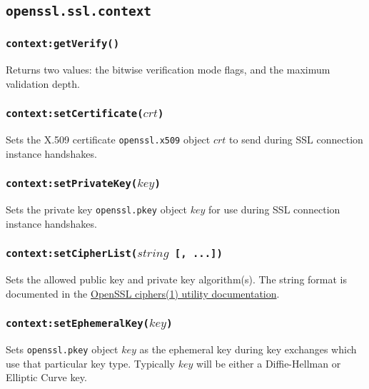 \documentclass[11pt, oneside]{memoir}
\newcommand*{\fn}[1]{\texttt{#1}\xspace}
\newcommand*{\module}[1]{\texttt{#1}\xspace}
\newcounter{toccols}
\newenvironment{Module}[1]{
	\subsection{\texttt{#1}}
	\addtocontents{toc}{
		\protect\begin{multicols}{\value{toccols}}
	}
}{
	\addtocontents{toc}{\protect\end{multicols}}
}
\begin{document}
\begin{Module}{openssl.ssl.context}
\subsubsection[\fn{context:getVerify}]{\fn{context:getVerify()}}

Returns two values: the bitwise verification mode flags, and the maximum validation depth.

\subsubsection[\fn{context:setCertificate}]{\fn{context:setCertificate($crt$)}}

Sets the X.509 certificate \module{openssl.x509} object $crt$ to send during SSL connection instance handshakes.

\subsubsection[\fn{context:setPrivateKey}]{\fn{context:setPrivateKey($key$)}}

Sets the private key \module{openssl.pkey} object $key$ for use during SSL connection instance handshakes.

\subsubsection[\fn{context:setCipherList}]{\fn{context:setCipherList($string$ [, ...])}}

Sets the allowed public key and private key algorithm(s). The string format is documented in the \href{http://www.openssl.org/docs/apps/ciphers.html#CIPHER_LIST_FORMAT}{OpenSSL ciphers(1) utility documentation}.

\subsubsection[\fn{context:setEphemeralKey}]{\fn{context:setEphemeralKey($key$)}}

Sets \module{openssl.pkey} object $key$ as the ephemeral key during key exchanges which use that particular key type. Typically $key$ will be either a Diffie-Hellman or Elliptic Curve key.


\end{Module}
\end{document}
